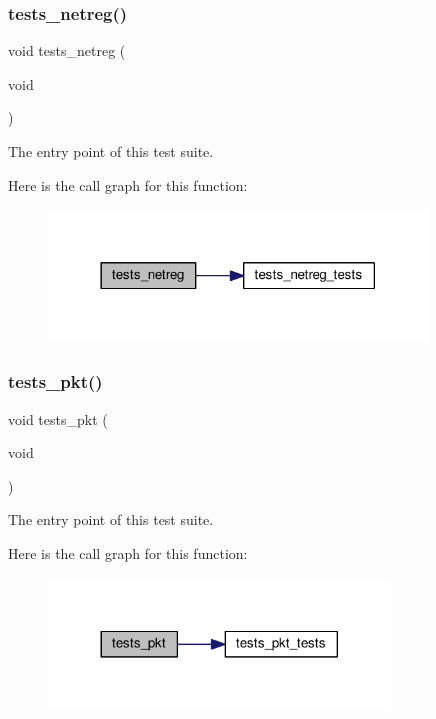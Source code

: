 \subsubsection{\texorpdfstring{tests\+\_\+netreg()}{tests\_netreg()}}
{\footnotesize\ttfamily void tests\+\_\+netreg (\begin{DoxyParamCaption}\item[{void}]{ }\end{DoxyParamCaption})}



The entry point of this test suite. 

Here is the call graph for this function\+:
\nopagebreak
\begin{figure}[H]
\begin{center}
\leavevmode
\includegraphics[width=285pt]{group__unittests_ga9597c8b9433b48f9ce8be48a398bd607_cgraph}
\end{center}
\end{figure}
\mbox{\label{group__unittests_gac6498b5301bbbb078c592d170ae7337d}} 
\subsubsection{\texorpdfstring{tests\+\_\+pkt()}{tests\_pkt()}}
{\footnotesize\ttfamily void tests\+\_\+pkt (\begin{DoxyParamCaption}\item[{void}]{ }\end{DoxyParamCaption})}



The entry point of this test suite. 

Here is the call graph for this function\+:
\nopagebreak
\begin{figure}[H]
\begin{center}
\leavevmode
\includegraphics[width=257pt]{group__unittests_gac6498b5301bbbb078c592d170ae7337d_cgraph}
\end{center}
\end{figure}
\mbox{\label{group__unittests_gaa089380b8bfe478c2b7f3684af323767}} 
